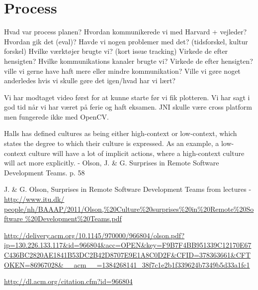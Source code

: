 
\section{Process}
\label{process}

Hvad var process planen?
Hvordan kommunikerede vi med Harvard + vejleder?
Hvordan gik det (eval)?
Havde vi nogen problemer med det? (tidsforskel, kultur forskel)
Hvilke værktøjer brugte vi? (kort issue tracking)
Virkede de efter hensigten?
Hvilke kommunikations kanaler brugte vi?
Virkede de efter hensigten? ville vi gerne have haft mere eller mindre kommunikation?
Ville vi gøre noget anderledes hvis vi skulle gøre det igen/hvad har vi lært?

Vi har modtaget video først for at kunne starte før vi fik plotteren.
Vi har sagt i god tid når vi har været på ferie og haft eksamen.
JNI skulle være cross platform men fungerede ikke med OpenCV.

Halls has defined cultures as being either high-context or low-context, which states the degree to which their culture is expressed. As an example, a low-context culture will have a lot of implicit actions, where a high-context culture will act more explicitly.
- Olson, J. \& G. Surprises in Remote Software Development Teams. p. 58

J. \& G. Olson, Surprises in Remote Software Development Teams from lectures - \url{http://www.itu.dk/ people/nh/BAAAP/2011/Olson,%20Culture%20surprises%20in%20Remote%20Software %20Development%20Teams.pdf}

\url{http://delivery.acm.org/10.1145/970000/966804/olson.pdf?ip=130.226.133.117&id=966804&acc=OPEN&key=F9B7F4BB951339C12170E67C436BC2820AE1841B53DC2B42D8707E9E1A8C0D2F&CFID=378363661&CFTOKEN=86967028&__acm__=1384268141_38f7c1e2b1f339624b7349b5d33a1fc1}

\url{http://dl.acm.org/citation.cfm?id=966804}
